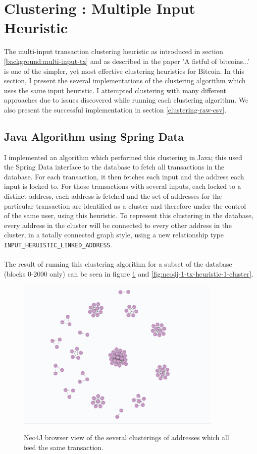 \section{Clustering : Multiple Input Heuristic}\label{section-clustering}

The multi-input transaction clustering heuristic as introduced in section \ref{background:multi-input-tx} and as described in the paper 'A fistful of bitcoins...' \cite{RefWorks:doc:5c3de7e3e4b0ea6196452d80} is one of the simpler, yet most effective clustering heuristics for Bitcoin. In this section, I present the several implementations of the clustering algorithm which uses the same input heuristic. I attempted clustering with many different approaches due to issues discovered while running each clustering algorithm. We also present the successful implementation in section \ref{clustering-raw-csv}.

\subsection{Java Algorithm using Spring Data}
I implemented an algorithm which performed this clustering in Java; this used the Spring Data interface to the database to fetch all transactions in the database. For each transaction, it then fetches each input and the address each input is locked to. For those transactions with several inputs, each locked to a distinct address, each address is fetched and the set of addresses for the particular transaction are identified as a cluster and therefore under the control of the same user, using this heuristic. To represent this clustering in the database, every address in the cluster will be connected to every other address in the cluster, in a totally connected graph style, using a new relationship type \texttt{INPUT\_HERUISTIC\_LINKED\_ADDRESS}. 
\\\\
The result of running this clustering algorithm for a subset of the database (blocks 0-2000 only) can be seen in figure \ref{fig:neo4j-many-heuristic-1-clusters} and \ref{fig:neo4j-1-tx-heuristic-1-cluster}. 

\begin{figure}[h!]
  \centering
  \includegraphics[width = 10cm]{./figures/many-clusters-heuristic-1}\\[0.5cm] 
  \caption{Neo4J browser view of the several clusterings of addresses which all feed the same transaction.}
  \label{fig:neo4j-many-heuristic-1-clusters}
\end{figure}

